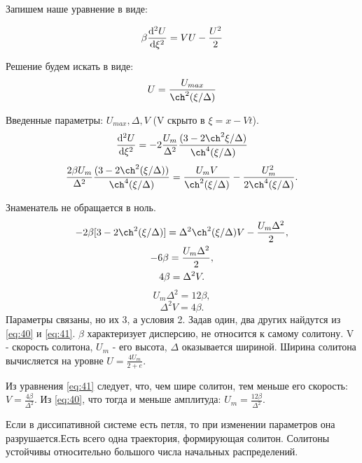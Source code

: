Запишем наше уравнение в виде:

\begin{equation}
	\beta\dv[2]{U}{\xi}=VU-\frac{U^2}{2}
	\label{eq:37}
\end{equation}

Решение будем искать в виде:
\begin{equation}
	U=\frac{U_{max}}{\ch^2{(\xi / \Delta)}}
	\label{eq:38}
\end{equation}

Введенные параметры: $U_{max}, \Delta, V$ (V скрыто в $\xi=x-Vt$).
\begin{equation}
	\dv[2]{U}{\xi}=-2\frac{U_m}{\Delta^2}\frac{(3-2\ch^2{\xi / \Delta)}}{\ch^4{(\xi / \Delta)}}
	\label{eq:39}
\end{equation}
\begin{gather*}
	\frac{2\beta U_m}{\Delta^2}\frac{(3-2\ch^2{(\xi / \Delta))}}{\ch^4{(\xi / \Delta)}}=\frac{U_m V}{\ch^2{(\xi / \Delta)}}-\frac{U_m^2}{2\ch^4{(\xi / \Delta)}}.
\end{gather*}

Знаменатель не обращается в ноль.
\begin{gather*}
	-2\beta[3-2\ch^2{(\xi / \Delta)}]=\Delta^2 \ch^2{(\xi / \Delta)}V-\frac{U_m \Delta^2}{2}, \\
	-6\beta=\frac{U_m \Delta^2}{2}, \\
	4\beta=\Delta^2V.
\end{gather*}
\begin{equation}
	U_m \Delta^2= 12\beta,
	\label{eq:40}
\end{equation}
\begin{equation}
	\Delta^2V=4\beta.
	\label{eq:41}
\end{equation}
Параметры связаны, но их 3, а условия 2. Задав один, два других найдутся из \eqref{eq:40} и \eqref{eq:41}. $\beta$ характеризует дисперсию, не относится к самому солитону. V - скорость солитона, $U_m$ - его высота, $\Delta$ оказывается шириной. Ширина солитона вычисляется на уровне $U=\frac{4U_m}{2+e}$. 

Из уравнения \eqref{eq:41} следует, что, чем шире солитон, тем меньше его скорость: $V=\frac{4\beta}{\Delta^2}$. Из \eqref{eq:40}, что тогда и меньше амплитуда: $U_m=\frac{12\beta}{\Delta^2}$.

Если в диссипативной системе есть петля, то при изменении параметров она разрушается.Есть всего одна траектория, формирующая солитон. Солитоны устойчивы относительно большого числа начальных распределений. 

